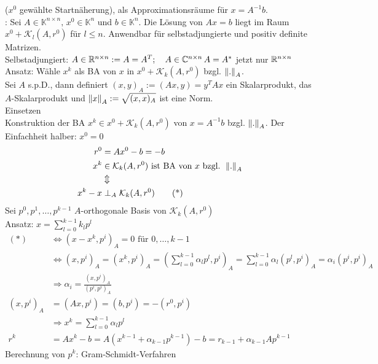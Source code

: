 ($x^0$ gewählte Startnäherung), als Approximationsräume für $x = A^{-1}b$.\\
\satz: Sei $A \in \mathbb{K}^{n \times n},\,x^0 \in \mathbb{K}^n$ und $b \in \mathbb{K}^n$. Die Lösung von
$Ax = b$ liegt im Raum $x^0 + \mathcal{K}_l(A,r^0)$ für $l \leq n$.
Anwendbar für selbstadjungierte und positiv definite Matrizen.\\
Selbstadjungiert: $A \in \mathbb{R}^{n \times n} := A = A^T; \quad A \in \mathbb{C}^{n \times n}\, A = A^*$ jetzt nur $\mathbb{R}^{n \times n}$\\
Ansatz: Wähle $x^k$ als BA von $x$ in $x^0 + \mathcal{K}_k(A,r^0)$ bzgl. $\left\lVert . \right\rVert_A$.\\
\satz Sei $A$ s.p.D., dann definiert $(x,y)_A := (Ax, y) = y^TAx$ ein Skalarprodukt, das $A$-Skalarprodukt und
$\left\lVert x \right\rVert_A := \sqrt{(x,x)_A}$ ist eine Norm.\\
\beweis Einsetzen\\
Konstruktion der BA $x^k \in x^0 + \mathcal{K}_k(A,r^0)$ von $x = A^{-1}b$ bzgl. $\left\lVert . \right\rVert_A$.
Der Einfachheit halber: $x^0 = 0$
\begin{align*}
  r^0 &= Ax^0 - b = -b\\
  x^k &\in \mathcal{K}_k(A,r^0) \text{ ist BA von } x \text{ bzgl. } \left\lVert . \right\rVert_A\\
  &\Updownarrow\\
  x^k - x &\perp_A \mathcal{K}_k(A,r^0) \tag{*}
\end{align*}
Sei $p^0, p^1,\ldots,p^{k-1}$ $A$-orthogonale Basis von $\mathcal{K}_k(A,r^0)$\\
Ansatz: $x = \sum^{k-1}_{l=0} k_l p^l$
\begin{align*}
  (*) &\Leftrightarrow (x - x^k, p^i)_A = 0 \text{ für } 0,\ldots,k-1\\
      &\Leftrightarrow (x,p^i)_A = (x^k,p^i)_A = (\sum^{k-1}_{l=0} \alpha_l p^l, p^i)_A 
        = \sum^{k-1}_{l=0} \alpha_l(p^l, p^i)_A = \alpha_i(p^i, p^i)_A\\
      &\Rightarrow \alpha_i = \frac{(x,p^i)_A}{(p^i,p^i)_A} \\
      (x,p^i)_A &= (Ax,p^i) = (b,p^i) = -(r^0,p^i)\\
      &\Rightarrow x^k = \sum^{k-1}_{l=0} \alpha_l p^l\\
      r^k &= Ax^k - b = A(x^{k-1} + \alpha_{k-1}p^{k-1}) - b = r_{k-1} + \alpha_{k-1}Ap^{k-1}
\end{align*}
Berechnung von $p^k$: Gram-Schmidt-Verfahren\\
